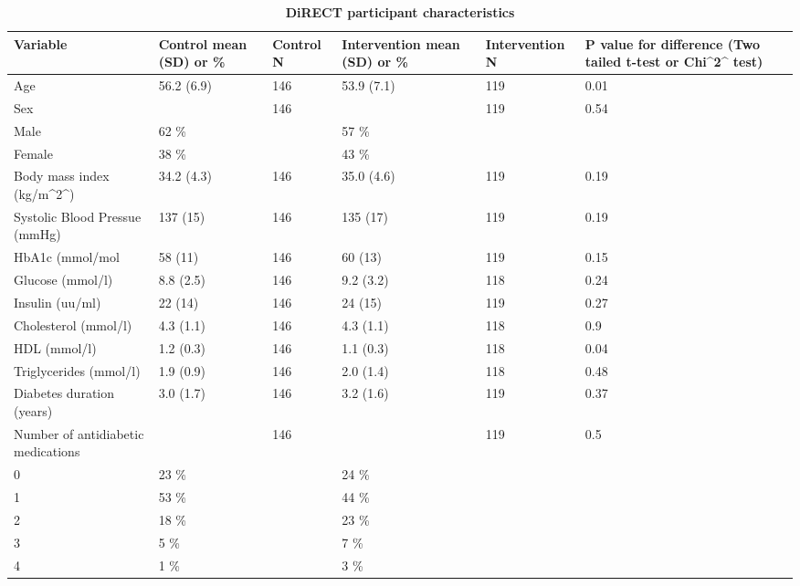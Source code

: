 \documentclass[11pt,twoside]{bristolthesis}
\begin{document}
\begin{landscape}
\begin{table}
\caption[DiRECT participant characteristics]{\label{tab:DiRECT-participants}\textbf{DiRECT participant characteristics}}
\centering
\begin{tabu} to 
\toprule
Variable & Control mean (SD) or \% & Control N & Intervention mean (SD) or \% & Intervention N & P value for difference (Two tailed t-test or Chi\textasciicircum{}2\textasciicircum{} test)\\
\midrule
Age & 56.2 (6.9) & 146 & 53.9 (7.1) & 119 & 0.01\\
Sex &  & 146 &  & 119 & 0.54\\
\hspace{1em}Male & 62 \% &  & 57 \% &  & \\
\hspace{1em}Female & 38 \% &  & 43 \% &  & \\
Body mass index (kg/m\textasciicircum{}2\textasciicircum{}) & 34.2 (4.3) & 146 & 35.0 (4.6) & 119 & 0.19\\
\addlinespace
Systolic Blood Pressue (mmHg) & 137 (15) & 146 & 135 (17) & 119 & 0.19\\
HbA1c (mmol/mol & 58 (11) & 146 & 60 (13) & 119 & 0.15\\
Glucose (mmol/l) & 8.8 (2.5) & 146 & 9.2 (3.2) & 118 & 0.24\\
Insulin (uu/ml) & 22 (14) & 146 & 24 (15) & 119 & 0.27\\
Cholesterol (mmol/l) & 4.3 (1.1) & 146 & 4.3 (1.1) & 118 & 0.9\\
\addlinespace
HDL (mmol/l) & 1.2 (0.3) & 146 & 1.1 (0.3) & 118 & 0.04\\
Triglycerides (mmol/l) & 1.9 (0.9) & 146 & 2.0 (1.4) & 118 & 0.48\\
Diabetes duration (years) & 3.0 (1.7) & 146 & 3.2 (1.6) & 119 & 0.37\\
Number of antidiabetic medications &  & 146 &  & 119 & 0.5\\
\hspace{1em}0 & 23 \% &  & 24 \% &  & \\
\addlinespace
\hspace{1em}1 & 53 \% &  & 44 \% &  & \\
\hspace{1em}2 & 18 \% &  & 23 \% &  & \\
\hspace{1em}3 & 5 \% &  & 7 \% &  & \\
\hspace{1em}4 & 1 \% &  & 3 \% &  & \\

\end{tabu}
\end{table}
\end{landscape}
\end{document}

